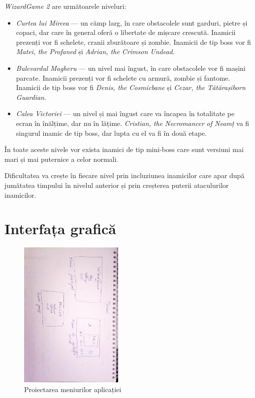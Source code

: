 \documentclass{article}
\begin{document}
    \emph{WizardGame 2} are următoarele niveluri:
    \begin{itemize}
        \item \emph{Curtea lui Mircea} --- un cămp larg, în care obstacolele sunt garduri,
        pietre și copaci, dar care în general oferă o libertate de mișcare crescută. Inamicii
        prezenți vor fi schelete, cranii zburătoare și zombie. Inamicii de tip boss vor fi
        \emph{Matei, the Profaned} și \emph{Adrian, the Crimson Undead}.
        \item \emph{Bulevardul Magheru} --- un nivel mai îngust, în care obstacolele vor fi
        mașini parcate. Inamicii prezenți vor fi schelete cu armură, zombie și fantome. Inamicii
        de tip boss vor fi \emph{Denis, the Cosmicbane} și \emph{Cezar, the Tătărașiborn Guardian}.
        \item \emph{Calea Victoriei} --- un nivel și mai îngust care va încapea în totalitate pe
        ecran în înălțime, dar nu în lățime. \emph{Cristian, the Necromancer of Neamț} va fi
        singurul inamic de tip boss, dar lupta cu el va fi în două etape.
    \end{itemize}

    În toate aceste nivele vor exista inamici de tip mini-boss care sunt versiuni mai mari și mai
    puternice a celor normali.

    Dificultatea va crește în fiecare nivel prin incluziunea inamicilor care apar după jumătatea
    timpului în nivelul anterior și prin creșterea puterii ataculurilor inamicilor.

    \section{Interfața grafică}

    \begin{figure}[H]
        \includegraphics[width=0.45\textwidth, angle=90]{designing-menus}
        \centering
        \caption{Proiectarea meniurilor aplicației}
    \end{figure}
\end{document}
